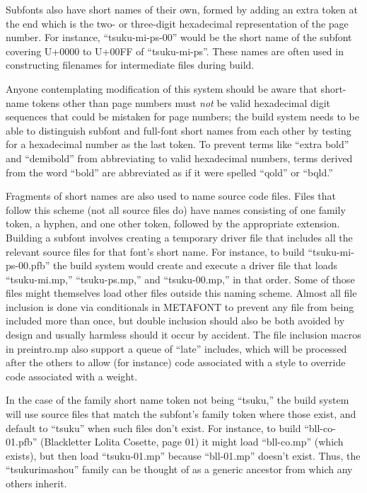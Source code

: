 \documentclass[14pt]{extarticle}
\begin{document}
Subfonts also have short names of their own, formed by adding an extra token
at the end which is the two- or three-digit hexadecimal representation of
the page number.  For instance, ``tsuku-mi-ps-00'' would be the short name
of the subfont covering U+0000 to U+00FF of ``tsuku-mi-ps''.  These names
are often used in constructing filenames for intermediate files during
build.

Anyone contemplating modification of this system should be aware that
short-name tokens other than page numbers must \emph{not} be valid
hexadecimal digit sequences that could be mistaken for page numbers; the
build system needs to be able to distinguish subfont and full-font short
names from each other by testing for a hexadecimal number as the last
token.  To prevent terms like ``extra bold'' and ``demibold'' from
abbreviating to valid hexadecimal numbers, terms derived from the word
``bold'' are abbreviated as if it were spelled ``qold'' or ``bqld.''

Fragments of short names are also used to name source code files.  Files
that follow this scheme (not all source files do) have names consisting of
one family token, a hyphen, and one other token, followed by the appropriate
extension.  Building a subfont involves creating a temporary driver file
that includes all the relevant source files for that font's short name.  For
instance, to build ``tsuku-mi-ps-00.pfb'' the build system would create and
execute a driver file that loads ``tsuku-mi.mp,'' ``tsuku-ps.mp,'' and
``tsuku-00.mp,'' in that order.  Some of those files might themselves load
other files outside this naming scheme.  Almost all file inclusion is done
via conditionals in METAFONT to prevent any file from being included more
than once, but double inclusion should also be both avoided by design and
usually harmless should it occur by accident.  The file inclusion macros in
preintro.mp also support a queue of ``late'' includes, which will be
processed after the others to allow (for instance) code associated with a
style to override code associated with a weight.

In the case of the family short name token not being ``tsuku,'' the build
system will use source files that match the subfont's family token where
those exist, and default to ``tsuku'' when such files don't exist.  For
instance, to build ``bll-co-01.pfb'' (Blackletter Lolita Cosette, page 01)
it might load ``bll-co.mp'' (which exists), but then load ``tsuku-01.mp''
because ``bll-01.mp'' doesn't exist.  Thus, the ``tsukurimashou'' family can
be thought of as a generic ancestor from which any others inherit.
\end{document}

